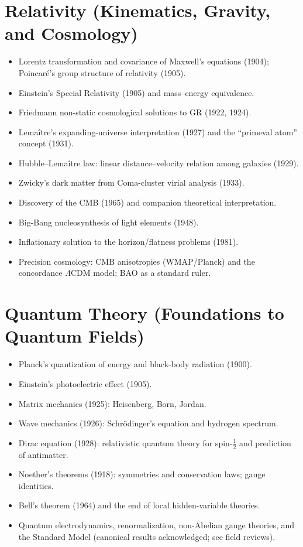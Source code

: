 \documentclass[11pt]{article}
\begin{document}
\section{Relativity (Kinematics, Gravity, and Cosmology)}
\begin{itemize}
  \item Lorentz transformation and covariance of Maxwell's equations (1904); Poincar\'e's group structure of relativity (1905). \citep{Lorentz1904,Poincare1905}
  \item Einstein's Special Relativity (1905) and mass--energy equivalence. \citep{Einstein1905}
  \item Friedmann non-static cosmological solutions to GR (1922, 1924). \citep{Friedmann1922}
  \item Lema\^itre's expanding-universe interpretation (1927) and the ``primeval atom'' concept (1931). \citep{Lemaitre1931}
  \item Hubble--Lema\^itre law: linear distance--velocity relation among galaxies (1929). \citep{Hubble1929}
  \item Zwicky's dark matter from Coma-cluster virial analysis (1933). \citep{Zwicky1933,Andernach2017}
  \item Discovery of the CMB (1965) and companion theoretical interpretation. \citep{PenziasWilson1965,Dicke1965}
  \item Big-Bang nucleosynthesis of light elements (1948). \citep{ABG1948}
  \item Inflationary solution to the horizon/flatness problems (1981). \citep{Guth1981}
  \item Precision cosmology: CMB anisotropies (WMAP/Planck) and the concordance $\Lambda$CDM model; BAO as a standard ruler. \citep{Planck2013,WMAP7}
\end{itemize}
\section{Quantum Theory (Foundations to Quantum Fields)}
\begin{itemize}
  \item Planck's quantization of energy and black-body radiation (1900). \citep{PlanckHist}
  \item Einstein's photoelectric effect (1905). \citep{Einstein1905}
  \item Matrix mechanics (1925): Heisenberg, Born, Jordan. \citep{MatrixMechHist}
  \item Wave mechanics (1926): Schr\"odinger's equation and hydrogen spectrum. \citep{Schrodinger1926}
  \item Dirac equation (1928): relativistic quantum theory for spin-$\tfrac{1}{2}$ and prediction of antimatter. \citep{Dirac1928}
  \item Noether's theorems (1918): symmetries and conservation laws; gauge identities. \citep{NoetherBook}
  \item Bell's theorem (1964) and the end of local hidden-variable theories. \citep{Bell1964,ScholarpediaBell}
  \item Quantum electrodynamics, renormalization, non-Abelian gauge theories, and the Standard Model (canonical results acknowledged; see field reviews).
\end{itemize}
\end{document}
